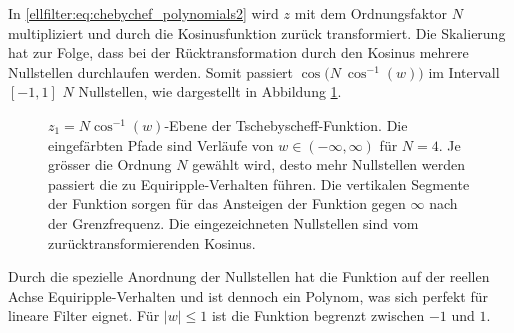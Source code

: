 In \eqref{ellfilter:eq:chebychef_polynomials2} wird $z$ mit dem Ordnungsfaktor $N$ multipliziert und durch die Kosinusfunktion zurück transformiert.
Die Skalierung hat zur Folge, dass bei der Rücktransformation durch den Kosinus mehrere Nullstellen durchlaufen werden.
Somit passiert $\cos \big( N~\cos^{-1}(w) \big)$ im Intervall $[-1, 1]$ $N$ Nullstellen, wie dargestellt in Abbildung \ref{ellfilter:fig:arccos2}.
\begin{figure}
    \centering
    
    \caption{
        $z_1=N \cos^{-1}(w)$-Ebene der Tschebyscheff-Funktion.
        Die eingefärbten Pfade sind Verläufe von $w\in(-\infty, \infty)$ für $N = 4$.
        Je grösser die Ordnung $N$ gewählt wird, desto mehr Nullstellen werden passiert die zu Equiripple-Verhalten führen.
        Die vertikalen Segmente der Funktion sorgen für das Ansteigen der Funktion gegen $\infty$ nach der Grenzfrequenz.
        Die eingezeichneten Nullstellen sind vom zurücktransformierenden Kosinus.
    }
    \label{ellfilter:fig:arccos2}
\end{figure}
Durch die spezielle Anordnung der Nullstellen hat die Funktion auf der reellen Achse Equiripple-Verhalten und ist dennoch ein Polynom, was sich perfekt für lineare Filter eignet.
Für $|w| \le 1$ ist die Funktion begrenzt zwischen $-1$ und $1$.

